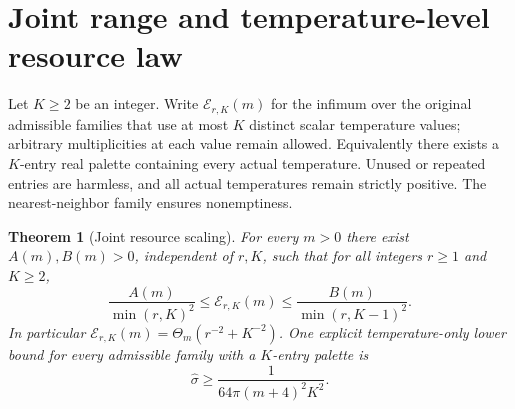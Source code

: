 \documentclass[11pt]{article}
\newtheorem{theorem}{Theorem}
\begin{document}
\section{Joint range and temperature-level resource law}\label{sec:resources}
Let $K\ge2$ be an integer. Write $\mathcal E_{r,K}(m)$ for the infimum over the original admissible families that use at most $K$ distinct scalar temperature values; arbitrary multiplicities at each value remain allowed. Equivalently there exists a $K$-entry real palette containing every actual temperature. Unused or repeated entries are harmless, and all actual temperatures remain strictly positive. The nearest-neighbor family ensures nonemptiness.
\begin{theorem}[Joint resource scaling]\label{jointresource}
For every $m>0$ there exist $A(m),B(m)>0$, independent of $r,K$, such that for all integers $r\ge1$ and $K\ge2$,
\begin{equation}\label{jointresourcebounds}
\frac{A(m)}{\min(r,K)^2}\le \mathcal E_{r,K}(m)\le
\frac{B(m)}{\min(r,K-1)^2}.
\end{equation}
In particular $\mathcal E_{r,K}(m)=\Theta_m(r^{-2}+K^{-2})$. One explicit temperature-only lower bound for every admissible family with a $K$-entry palette is
\begin{equation}\label{palettelower}
\hat\sigma\ge\frac{1}{64\pi(m+4)^2 K^2}.
\end{equation}
\end{theorem}
\end{document}
